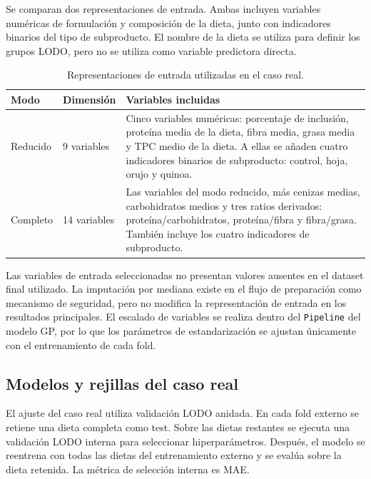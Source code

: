 Se comparan dos representaciones de entrada. Ambas incluyen variables numéricas de formulación y composición de la dieta, junto con indicadores binarios del tipo de subproducto. El nombre de la dieta se utiliza para definir los grupos LODO, pero no se utiliza como variable predictora directa.

\begin{table}[htbp]
\centering
\small
\caption[Representaciones de entrada del caso real]{Representaciones de entrada utilizadas en el caso real.}
\label{tab:app_real_feature_modes}
\renewcommand{\arraystretch}{1.15}
\begin{tabularx}{\textwidth}{@{}p{3.2cm}p{2.2cm}X@{}}
\toprule
\textbf{Modo} & \textbf{Dimensión} & \textbf{Variables incluidas} \\
\midrule
Reducido &
9 variables &
Cinco variables numéricas: porcentaje de inclusión, proteína media de la dieta, fibra media, grasa media y TPC medio de la dieta. A ellas se añaden cuatro indicadores binarios de subproducto: control, hoja, orujo y quinoa. \\

Completo &
14 variables &
Las variables del modo reducido, más cenizas medias, carbohidratos medios y tres ratios derivados: proteína/carbohidratos, proteína/fibra y fibra/grasa. También incluye los cuatro indicadores de subproducto. \\
\bottomrule
\end{tabularx}
\end{table}
\FloatBarrier

Las variables de entrada seleccionadas no presentan valores ausentes en el dataset final utilizado. La imputación por mediana existe en el flujo de preparación como mecanismo de seguridad, pero no modifica la representación de entrada en los resultados principales. El escalado de variables se realiza dentro del \texttt{Pipeline} del modelo GP, por lo que los parámetros de estandarización se ajustan únicamente con el entrenamiento de cada fold.

\subsection{Modelos y rejillas del caso real}
\label{app:modelos_grids_caso_real}

El ajuste del caso real utiliza validación LODO anidada. En cada fold externo se retiene una dieta completa como test. Sobre las dietas restantes se ejecuta una validación LODO interna para seleccionar hiperparámetros. Después, el modelo se reentrena con todas las dietas del entrenamiento externo y se evalúa sobre la dieta retenida. La métrica de selección interna es MAE.

